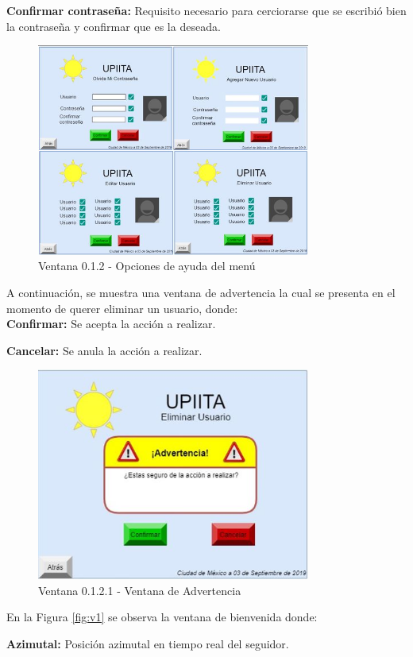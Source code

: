 \textbf{Confirmar contraseña:} Requisito necesario para cerciorarse que se escribió bien la contraseña y confirmar que es la deseada.
\begin{figure}[H]
	\centering
	\includegraphics[width=9cm]{imagenes/v012}
	\caption{Ventana 0.1.2 - Opciones de ayuda del menú}
	\label{fig:v012}
\end{figure}

A continuación, se muestra una ventana de advertencia la cual se presenta en el momento de querer eliminar un usuario, donde: \\

\textbf{Confirmar:} Se acepta la acción a realizar.

\textbf{Cancelar:} Se anula la acción a realizar.

\begin{figure}[H]
	\centering
	\includegraphics[width=9cm]{imagenes/v0121}
	\caption{Ventana 0.1.2.1 - Ventana de Advertencia}
	\label{fig:v0121}
\end{figure}

En la Figura \ref{fig:v1} se observa la ventana de bienvenida donde:

\textbf{Azimutal:} Posición azimutal en tiempo real del seguidor.

